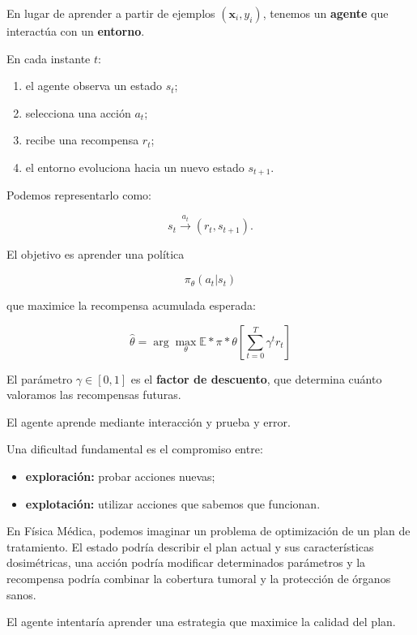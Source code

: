 \documentclass[
  letterpaper,
  DIV=11,
  numbers=noendperiod]{scrartcl}
\providecommand{\tightlist}{%
  \setlength{\itemsep}{0pt}\setlength{\parskip}{0pt}}
\begin{document}
En lugar de aprender a partir de ejemplos \((\mathbf{x}_i,y_i)\),
tenemos un \textbf{agente} que interactúa con un \textbf{entorno}.

En cada instante \(t\):

\begin{enumerate}
\def\labelenumi{\arabic{enumi}.}
\tightlist
\item
  el agente observa un estado \(s_t\);
\item
  selecciona una acción \(a_t\);
\item
  recibe una recompensa \(r_t\);
\item
  el entorno evoluciona hacia un nuevo estado \(s_{t+1}\).
\end{enumerate}

Podemos representarlo como:

\[
s_t
\xrightarrow{\;a_t\;}
(r_t,s_{t+1}).
\]

El objetivo es aprender una política

\[
\pi_\theta(a_t|s_t)
\]

que maximice la recompensa acumulada esperada:

\[
\hat{\theta}
=
\arg\max_{\theta}
\mathbb{E}*{\pi*\theta}
\left[
\sum_{t=0}^{T}
\gamma^t r_t
\right]
\]

El parámetro \(\gamma\in[0,1]\) es el \textbf{factor de descuento}, que
determina cuánto valoramos las recompensas futuras.

El agente aprende mediante interacción y prueba y error.

Una dificultad fundamental es el compromiso entre:

\begin{itemize}
\tightlist
\item
  \textbf{exploración:} probar acciones nuevas;
\item
  \textbf{explotación:} utilizar acciones que sabemos que funcionan.
\end{itemize}

En Física Médica, podemos imaginar un problema de optimización de un
plan de tratamiento. El estado podría describir el plan actual y sus
características dosimétricas, una acción podría modificar determinados
parámetros y la recompensa podría combinar la cobertura tumoral y la
protección de órganos sanos.

El agente intentaría aprender una estrategia que maximice la calidad del
plan.
\end{document}
